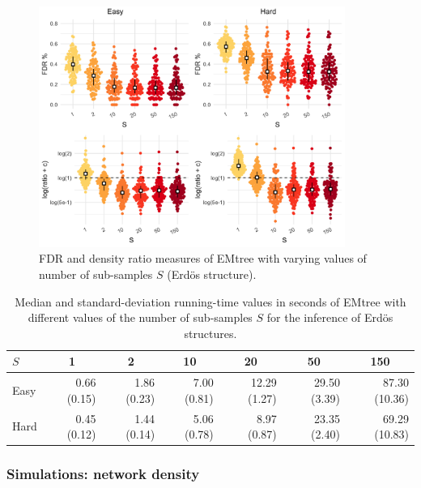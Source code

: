 \vspace{1.5cm}

\begin{figure}[H]
    \centering
    \includegraphics[width=10cm]{figs/S_effect.png}
    \caption{FDR and density ratio measures of EMtree with varying values of number of sub-samples $S$ (Erdös structure).}
    \label{Seffect}
\end{figure}


\begin{table}[ht]
\centering
\begin{tabular}{l|rrrrrr}
  $S$ & \multicolumn{1}{c}{1} & \multicolumn{1}{c}{2} & \multicolumn{1}{c}{10} & \multicolumn{1}{c}{20} & \multicolumn{1}{c}{50} & \multicolumn{1}{c}{150} \\ \hline
  Easy & 0.66  (0.15) & 1.86  (0.23) & 7.00  (0.81) & 12.29  (1.27) & 29.50  (3.39) & 87.30  (10.36) \\ 
  Hard & 0.45  (0.12) & 1.44  (0.14) & 5.06  (0.78) & 8.97  (0.87) & 23.35  (2.40) & 69.29  (10.83) \\ 
   \hline
\end{tabular}
\caption{Median and standard-deviation running-time values in seconds of EMtree with different values of the number of sub-samples $S$ for the inference of Erdös structures.}
\label{timesS}
\end{table}

\subsubsection{Simulations: network density}


